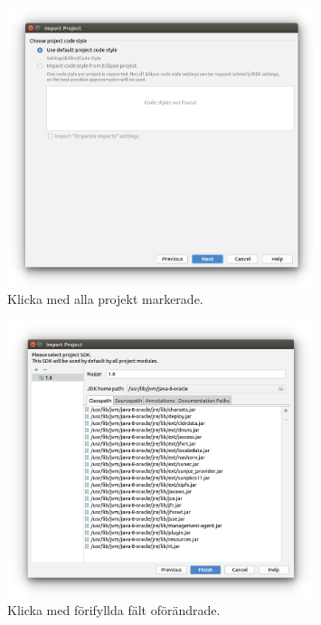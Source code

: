 \begin{figure}
\centering
\includegraphics[width=0.8\textwidth]{../img/intellij/idea-import6-code-style.png}
\caption{Klicka  med alla projekt markerade.}
\label{fig:idea:import6-code-style}
\end{figure}


\begin{figure}
\centering
\includegraphics[width=0.8\textwidth]{../img/intellij/idea-import6-select-SDK.png}
\caption{Klicka  med förifyllda fält oförändrade.}
\label{fig:idea:import6-select-SDK}
\end{figure}

